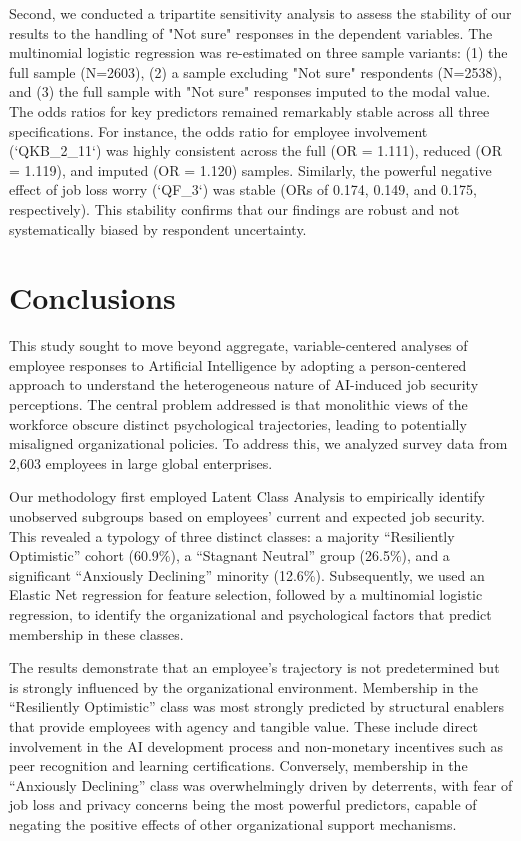 \documentclass[]{article}
\begin{document}
Second, we conducted a tripartite sensitivity analysis to assess the stability of our results to the handling of "Not sure" responses in the dependent variables. The multinomial logistic regression was re-estimated on three sample variants: (1) the full sample (N=2603), (2) a sample excluding "Not sure" respondents (N=2538), and (3) the full sample with "Not sure" responses imputed to the modal value. The odds ratios for key predictors remained remarkably stable across all three specifications. For instance, the odds ratio for employee involvement (`QKB\_2\_11`) was highly consistent across the full (OR = 1.111), reduced (OR = 1.119), and imputed (OR = 1.120) samples. Similarly, the powerful negative effect of job loss worry (`QF\_3`) was stable (ORs of 0.174, 0.149, and 0.175, respectively). This stability confirms that our findings are robust and not systematically biased by respondent uncertainty.

\section{Conclusions}
\label{sec:conclusions}
This study sought to move beyond aggregate, variable-centered analyses of employee responses to Artificial Intelligence by adopting a person-centered approach to understand the heterogeneous nature of AI-induced job security perceptions. The central problem addressed is that monolithic views of the workforce obscure distinct psychological trajectories, leading to potentially misaligned organizational policies. To address this, we analyzed survey data from 2,603 employees in large global enterprises.

Our methodology first employed Latent Class Analysis to empirically identify unobserved subgroups based on employees' current and expected job security. This revealed a typology of three distinct classes: a majority ``Resiliently Optimistic'' cohort (60.9\%), a ``Stagnant Neutral'' group (26.5\%), and a significant ``Anxiously Declining'' minority (12.6\%). Subsequently, we used an Elastic Net regression for feature selection, followed by a multinomial logistic regression, to identify the organizational and psychological factors that predict membership in these classes.

The results demonstrate that an employee's trajectory is not predetermined but is strongly influenced by the organizational environment. Membership in the ``Resiliently Optimistic'' class was most strongly predicted by structural enablers that provide employees with agency and tangible value. These include direct involvement in the AI development process and non-monetary incentives such as peer recognition and learning certifications. Conversely, membership in the ``Anxiously Declining'' class was overwhelmingly driven by deterrents, with fear of job loss and privacy concerns being the most powerful predictors, capable of negating the positive effects of other organizational support mechanisms.
\end{document}

